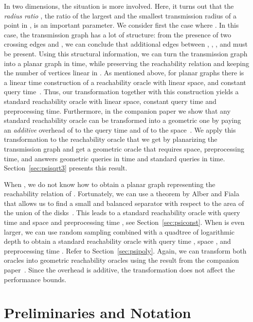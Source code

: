 \documentclass[11pt,a4paper]{paper}
\begin{document}
In two dimensions, the situation is more involved.
Here, it turns out that the \emph{radius ratio} , the ratio of the
largest and the smallest transmission radius of a point in , is
an important parameter.
We consider first the case where . In this case,
the transmission graph has a lot
of structure: from the presence of two crossing edges  and
, we can conclude that additional edges between
, , , and  must be present.
Using this structural information, we can turn the
transmission graph into a planar graph in  time,
while preserving the reachability relation
and keeping the number of vertices linear in .
As mentioned above, for planar graphs there is a linear time
construction of a reachability oracle with linear space, and
constant query time~\cite{Holm2015}. Thus, our transformation together with
this construction yields a standard
reachability oracle with linear space, constant query time 
and  preprocessing time. Furthermore, in the companion paper
we show that any standard reachability oracle can be
transformed into a  geometric one by paying an \emph{additive}
overhead of  to the query time and of 
to the space~\cite{KaplanEtAl15}. We apply this transformation to the reachability oracle that we get
by planarizing the transmission graph and get a geometric oracle that requires  
space,  preprocessing time, and  answers geometric queries in  time  and standard queries in  time.
 Section~\ref{sec:psisqrt3} presents this result.


When , we do not know how to obtain a planar graph representing
the reachability relation of .
Fortunately, we can use a theorem by Alber and Fiala that allows us
to find a small and balanced separator with respect to the area of the union
of the disks~\cite{AlberFiala04}. This leads to
a standard reachability oracle with query time 
and space and preprocessing time ,
see Section~\ref{sec:psiconst}.
When  is even larger, we
can use random sampling combined with a quadtree of logarithmic
depth
to obtain a standard reachability oracle with query time ,
space , and
preprocessing time . Refer to
Section~\ref{sec:psipoly}.
Again, we can transform both oracles
into  geometric reachability oracles using the result from the
companion paper~\cite{KaplanEtAl15}. Since the overhead is
additive, the transformation does not affect the performance bounds.


\section{Preliminaries and Notation}
\label{sec:prelims}
\end{document}

